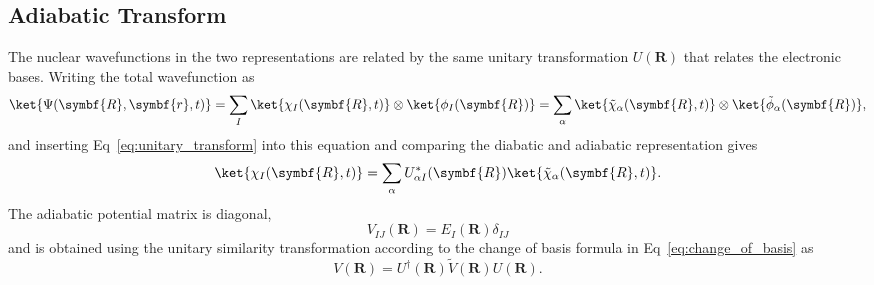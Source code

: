 \subsection{Adiabatic Transform}\label{sec:adiabatic_transform}
The nuclear wavefunctions in the two representations are related by the same unitary transformation $U(\symbf{R})$ that relates the electronic bases. Writing the total wavefunction as
\begin{equation}
\ket{\Psi(\symbf{R},\symbf{r},t)}=\sum_I\ket{\chi_I(\symbf{R},t)}\otimes\ket{\phi_I(\symbf{R})}=\sum_\alpha \ket{\tilde\chi_\alpha(\symbf{R},t)}\otimes\ket{\tilde\phi_\alpha(\symbf{R})},
\end{equation}
and inserting Eq~\eqref{eq:unitary_transform} into this equation and comparing the diabatic and adiabatic representation gives
\begin{equation}
\ket{\chi_I(\symbf{R},t)}=\sum_\alpha U_{\alpha I}^\ast(\symbf{R})\ket{\tilde\chi_\alpha(\symbf{R},t)}.
\end{equation}
The adiabatic potential matrix is diagonal,
\begin{equation}
V_{IJ}(\symbf{R})=E_I(\symbf{R})\delta_{IJ}
\end{equation}
and is obtained using the unitary similarity transformation according to the change of basis formula in Eq~\eqref{eq:change_of_basis} as
\begin{equation}
V(\symbf{R})=U^\dagger(\symbf{R})\tilde{V}(\symbf{R})U(\symbf{R}).
\end{equation}
